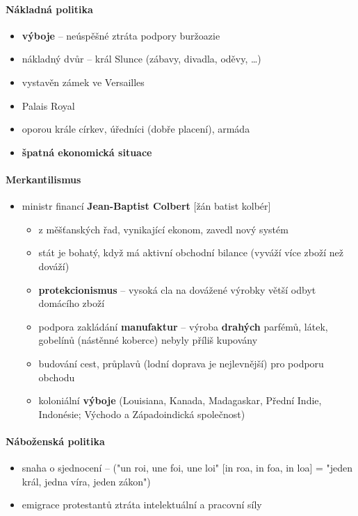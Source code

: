 \paragraph{Nákladná politika}
\begin{itemize}
\item \textbf{výboje} -- neúspěšné \ra ztráta podpory buržoazie
\item nákladný dvůr -- král Slunce (zábavy, divadla, oděvy, \ldots)
\item vystavěn zámek ve Versailles
\item Palais Royal
\item oporou krále církev, úředníci (dobře placení), armáda
\item[\ra] \textbf{špatná ekonomická situace}
\end{itemize}

\paragraph{Merkantilismus}
\begin{itemize}
\item ministr financí \textbf{Jean-Baptist Colbert} [žán batist kolbér]
	\begin{itemize}
	\item z měšťanských řad, vynikající ekonom, zavedl nový systém
	\item stát je bohatý, když má aktivní obchodní bilance (vyváží více zboží než dováží)
	\item[\ra] \textbf{protekcionismus} -- vysoká cla na dovážené výrobky \ra větší odbyt domácího zboží
	\item podpora zakládání \textbf{manufaktur} -- výroba \textbf{drahých} parfémů, látek, gobelínů (nástěnné koberce) \ra nebyly příliš kupovány
	\item budování cest, průplavů (lodní doprava je nejlevnější) pro podporu obchodu
	\item koloniální \textbf{výboje} (Louisiana, Kanada, Madagaskar, Přední Indie, Indonésie; Východo a Západoindická společnost)
	\end{itemize}
\end{itemize}

\paragraph{Náboženská politika}
\begin{itemize}
\item snaha o sjednocení -- ("un roi, une foi, une loi" [in roa, in foa, in loa] = "jeden král, jedna víra, jeden zákon")
\item \textbf{} \ra emigrace protestantů \ra ztráta intelektuální a pracovní síly
\end{itemize}

